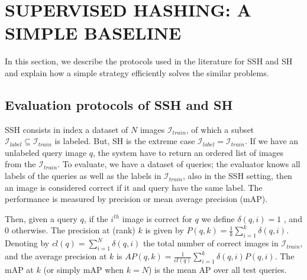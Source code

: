 \documentclass{article}
\begin{document}
\section{SUPERVISED HASHING: A SIMPLE BASELINE}


In this section, we describe the protocols used in the literature for SSH and SH and explain how a simple strategy efficiently solves the similar problems.

\subsection{Evaluation protocols of SSH and SH}

SSH consists in index a dataset of $N$ images $\mathcal{I}_{train}$, of which a subset $\mathcal{I}_{label} \subseteq \mathcal{I}_{train}$ is labeled.  But, SH is the extreme case $\mathcal{I}_{label} = \mathcal{I}_{train}$. If we have an unlabeled query image $q$, the system have to return an ordered list of images from the $\mathcal{I}_{train}$. To evaluate, we have a dataset of queries; the evaluator knows all labels of the queries as well as the labels in $\mathcal{I}_{train}$, also in the SSH setting, then an image is considered correct if it and query have the same label. The performance is measured by precision or mean average precision (mAP). 

Then, given a query $q$, if the $i^{th}$ image is correct for $q$ we define $\delta (q, i)=1$ , and $0$ otherwise. The precision at (rank) $k$ is given by $P(q,k) = \tfrac{1}{k} {\sum}_{i=1}^{k} \delta (q, i)$. Denoting by $cl(q) = {\sum}_{i=1}^{N} \delta (q, i)$ the total number of correct images in $\mathcal{I}_{train}$, and the average precision at $k$ is $AP(q, k) = \tfrac{1}{cl(q)}{\sum}_{i=1}^{k}\delta (q, i) P(q,i)$. The mAP at $k$ (or simply mAP when $k = N$) is the mean AP over all test queries.
\end{document}

